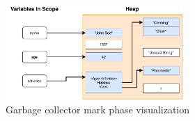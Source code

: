 \begin{figure}[htp!]
    \centering
    \includegraphics[width=0.6\textwidth]{assets/figures/chapter2/gc-visualization.pdf}
    \caption{Garbage collector mark phase visualization}
    \label{fig:gc-visualization}
\end{figure}
